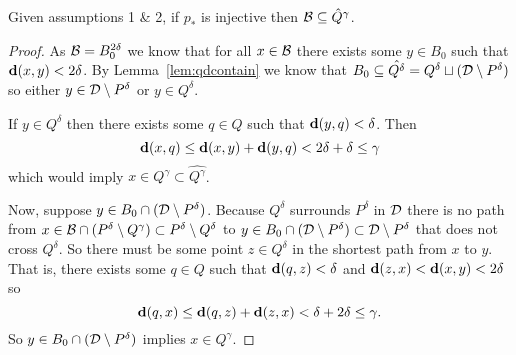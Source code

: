 \begin{lemma}\label{lem:qcontain}
    Given assumptions 1 \& 2, if $p_*$ is injective then ${\mathcal{B}}\subseteq \hat{Q}^\gamma$.
\end{lemma}
\begin{proof}
  As ${\mathcal{B}} = B_0^{2\delta}$ we know that for all $x\in{\mathcal{B}}$ there exists some $y\in B_0$ such that $\mathbf{d}(x, y) < 2\delta$.
  By Lemma~\ref{lem:qdcontain} we know that $B_0\subseteq \hat{Q^\delta} = Q^\delta\sqcup ({\mathcal{D}}\setminus P^\delta)$ so either $y\in {\mathcal{D}}\setminus P^\delta$ or $y\in Q^\delta$.

  If $y\in Q^\delta$ then there exists some $q\in Q$ such that $\mathbf{d}(y, q)<\delta$.
  Then
  \[ \mathbf{d}(x, q)\leq \mathbf{d}(x, y) + \mathbf{d}(y, q) < 2\delta + \delta \leq \gamma \]
  which would imply $x\in Q^\gamma\subset \hat{Q^\gamma}$.


  Now, suppose $y\in B_0\cap ({\mathcal{D}}\setminus P^\delta)$.%
  Because $Q^\delta$ surrounds $P^\delta$ in ${\mathcal{D}}$ there is no path from $x\in {\mathcal{B}}\cap (P^\delta\setminus Q^\gamma)\subset P^\delta\setminus Q^\delta$ to $y\in B_0\cap ({\mathcal{D}}\setminus P^\delta)\subset {\mathcal{D}}\setminus P^\delta$ that does not cross $Q^\delta$.
  So there must be some point $z\in Q^\delta$ in the shortest path from $x$ to $y$.
  That is, there exists some $q\in Q$ such that $\mathbf{d}(q, z) < \delta$ and $\mathbf{d}(z, x) < \mathbf{d}(x, y) < 2\delta$ so
  \[ \mathbf{d}(q, x)\leq \mathbf{d}(q, z) + \mathbf{d}(z, x) < \delta + 2\delta \leq \gamma. \]
  So $y\in B_0\cap ({\mathcal{D}}\setminus P^\delta)$ implies $x\in Q^\gamma$.
\end{proof}
